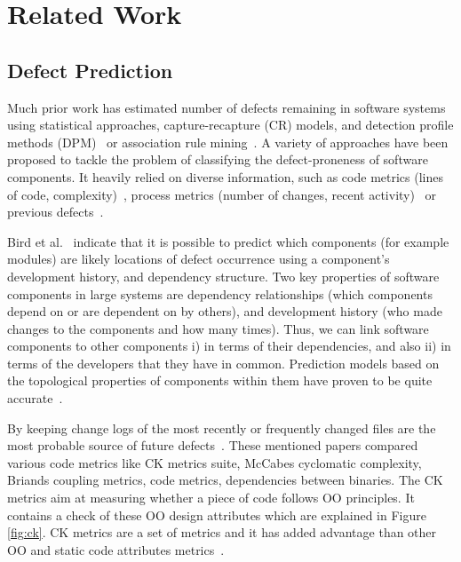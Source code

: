 \documentclass[10pt,conference]{IEEEtran}
\theoremstyle{break}
\theoremstyle{break}
\begin{document}
\section{Related Work}
\subsection{Defect Prediction}
\label{sect:review}

Much prior work has estimated number of defects remaining in software systems~\cite{hall2012systematic} using statistical approaches, capture-recapture 
(CR) models, and detection profile methods (DPM)~\cite{song2011general} or
association rule mining~\cite{song2006software}. A variety of approaches have been proposed to tackle the problem of classifying the defect-proneness of software components. It heavily relied on diverse information, such as code metrics (lines of code, complexity)~\cite{d2010extensive,menzies2007data, nagappan2006mining,shepperd2014researcher,Menzies2010}, process metrics (number of changes, recent activity)~\cite{hassan2009predicting} or previous defects~\cite{kim2007predicting}.

Bird et al.~\cite{bird2009putting} indicate that it is possible to predict which components (for example modules) are likely locations of
defect occurrence using a component's development history,
and dependency structure. Two key properties of software components
in large systems are dependency relationships (which components
depend on or are dependent on by others), and development
history (who made changes to the components and
how many times). Thus, we can link software components
to other components i) in terms of their dependencies, and
also ii) in terms of the developers that they have in common. Prediction models based on the topological properties
of components within them have proven to be quite
accurate~\cite{zimmermann2008predicting}.

By keeping change logs of the most recently or frequently changed files are the most probable source of future defects~\cite{hall2012systematic, catal2009systematic}. These mentioned papers compared various code metrics like CK  metrics  suite,  
McCabes  cyclomatic  complexity, Briands coupling metrics, code metrics, 
dependencies between  binaries. The CK metrics aim at measuring whether a 
piece of code follows OO principles. It contains a check of these OO design 
attributes which are explained in Figure \ref{fig:ck}. CK metrics are a set
of metrics and it has added advantage than other OO and static code attributes metrics~\cite{d2010extensive}. 
\end{document}
